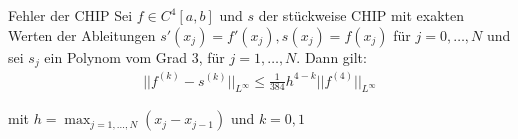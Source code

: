 \begin{theorem}[]{Fehler der CHIP}
    Sei $f \in C^4[a, b]$ und $s$ der stückweise CHIP mit exakten Werten der Ableitungen $s'(x_j) = f'(x_j), s(x_j) = f(x_j)$ für $j = 0, \ldots, N$
    und sei $s_j$ ein Polynom vom Grad $3$, für $j = 1, \ldots, N$. Dann gilt:
    \rmvspace
    \begin{align*}
        ||f^{(k)} - s^{(k)}||_{L^\infty} \leq \frac{1}{384} h^{4 - k} ||f^{(4)}||_{L^\infty}
    \end{align*}

    \rmvspace
    mit $h = \max_{j = 1, \ldots, N} (x_j - x_{j - 1})$ und $k = 0, 1$
\end{theorem}
